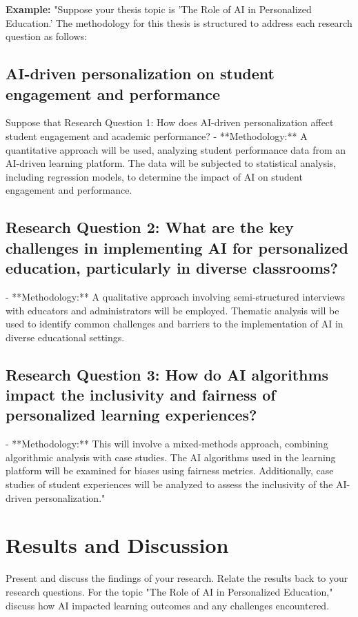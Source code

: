 \documentclass[english,f,master,binding,twoside,palatino, scrreprt]{WeSTthesis}
\begin{document}
\textbf{Example:}  
"Suppose your thesis topic is 'The Role of AI in Personalized Education.' The methodology for this thesis is structured to address each research question as follows:

\section {AI-driven personalization on student engagement and performance}
Suppose that Research Question 1: How does AI-driven personalization affect student engagement and academic performance?
   - **Methodology:** A quantitative approach will be used, analyzing student performance data from an AI-driven learning platform. The data will be subjected to statistical analysis, including regression models, to determine the impact of AI on student engagement and performance.

\section {Research Question 2: What are the key challenges in implementing AI for personalized education, particularly in diverse classrooms?}
   - **Methodology:** A qualitative approach involving semi-structured interviews with educators and administrators will be employed. Thematic analysis will be used to identify common challenges and barriers to the implementation of AI in diverse educational settings.

\section{Research Question 3: How do AI algorithms impact the inclusivity and fairness of personalized learning experiences?}
   - **Methodology:** This will involve a mixed-methods approach, combining algorithmic analysis with case studies. The AI algorithms used in the learning platform will be examined for biases using fairness metrics. Additionally, case studies of student experiences will be analyzed to assess the inclusivity of the AI-driven personalization."

\chapter{Results and Discussion}
Present and discuss the findings of your research. Relate the results back to your research questions. For the topic "The Role of AI in Personalized Education," discuss how AI impacted learning outcomes and any challenges encountered.
\end{document}
